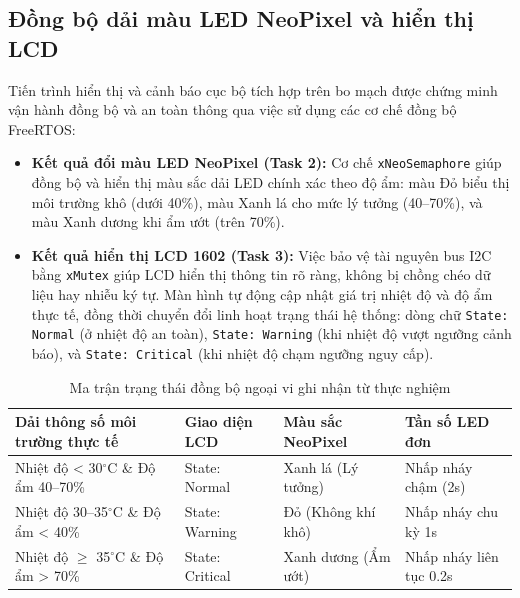 \subsection{Đồng bộ dải màu LED NeoPixel và hiển thị LCD}
Tiến trình hiển thị và cảnh báo cục bộ tích hợp trên bo mạch được chứng minh vận hành đồng bộ và an toàn thông qua việc sử dụng các cơ chế đồng bộ FreeRTOS:
\begin{itemize}
    \item \textbf{Kết quả đổi màu LED NeoPixel (Task 2):} Cơ chế \texttt{xNeoSemaphore} giúp đồng bộ và hiển thị màu sắc dải LED chính xác theo độ ẩm: màu Đỏ biểu thị môi trường khô (dưới 40\%), màu Xanh lá cho mức lý tưởng (40--70\%), và màu Xanh dương khi ẩm ướt (trên 70\%).
    \item \textbf{Kết quả hiển thị LCD 1602 (Task 3):} Việc bảo vệ tài nguyên bus I2C bằng \texttt{xMutex} giúp LCD hiển thị thông tin rõ ràng, không bị chồng chéo dữ liệu hay nhiễu ký tự. Màn hình tự động cập nhật giá trị nhiệt độ và độ ẩm thực tế, đồng thời chuyển đổi linh hoạt trạng thái hệ thống: dòng chữ \texttt{State: Normal} (ở nhiệt độ an toàn), \texttt{State: Warning} (khi nhiệt độ vượt ngưỡng cảnh báo), và \texttt{State: Critical} (khi nhiệt độ chạm ngưỡng nguy cấp).
\end{itemize}

\begin{table}[H]
    \centering
    \caption{Ma trận trạng thái đồng bộ ngoại vi ghi nhận từ thực nghiệm}
    \begin{tabular}{|>{\raggedright\arraybackslash}m{4.5cm}|>{\centering\arraybackslash}m{2.5cm}|>{\centering\arraybackslash}m{3.5cm}|>{\centering\arraybackslash}m{3.5cm}|}
    \hline
    \textbf{Dải thông số môi trường thực tế} & \textbf{Giao diện LCD} & \textbf{Màu sắc NeoPixel} & \textbf{Tần số LED đơn} \\ \hline
    Nhiệt độ < 30$^{\circ}$C \& Độ ẩm 40--70\% & State: Normal & Xanh lá (Lý tưởng) & Nhấp nháy chậm (2s) \\ \hline
    Nhiệt độ 30--35$^{\circ}$C \& Độ ẩm < 40\% & State: Warning & Đỏ (Không khí khô) & Nhấp nháy chu kỳ 1s \\ \hline
    Nhiệt độ $\ge$ 35$^{\circ}$C \& Độ ẩm > 70\% & State: Critical & Xanh dương (Ẩm ướt) & Nhấp nháy liên tục 0.2s \\ \hline
    \end{tabular}
\end{table}

